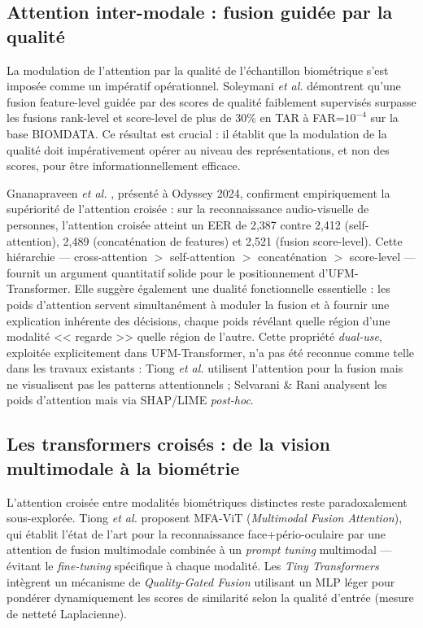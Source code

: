 \documentclass[12pt,a4paper]{report}
\begin{document}
\subsection{Attention inter-modale : fusion guid\'{e}e par la qualit\'{e}}

La modulation de l'attention par la qualit\'{e} de l'\'{e}chantillon biom\'{e}trique s'est impos\'{e}e comme un imp\'{e}ratif op\'{e}rationnel. Soleymani \textit{et al.} \cite{soleymani2021quality} d\'{e}montrent qu'une fusion feature-level guid\'{e}e par des scores de qualit\'{e} faiblement supervis\'{e}s surpasse les fusions rank-level et score-level de plus de 30\% en TAR \`{a} FAR=$10^{-4}$ sur la base BIOMDATA. Ce r\'{e}sultat est crucial : il \'{e}tablit que la modulation de la qualit\'{e} doit imp\'{e}rativement op\'{e}rer au niveau des repr\'{e}sentations, et non des scores, pour \^{e}tre informationnellement efficace.

Gnanapraveen \textit{et al.} \cite{gnanapraveen2024cross}, pr\'{e}sent\'{e} \`{a} Odyssey 2024, confirment empiriquement la sup\'{e}riorit\'{e} de l'attention crois\'{e}e : sur la reconnaissance audio-visuelle de personnes, l'attention crois\'{e}e atteint un EER de 2,387 contre 2,412 (self-attention), 2,489 (concat\'{e}nation de features) et 2,521 (fusion score-level). Cette hi\'{e}rarchie --- cross-attention $>$ self-attention $>$ concat\'{e}nation $>$ score-level --- fournit un argument quantitatif solide pour le positionnement d'UFM-Transformer. Elle sugg\`{e}re \'{e}galement une dualit\'{e} fonctionnelle essentielle : les poids d'attention servent simultan\'{e}ment \`{a} moduler la fusion et \`{a} fournir une explication inh\'{e}rente des d\'{e}cisions, chaque poids r\'{e}v\'{e}lant quelle r\'{e}gion d'une modalit\'{e} << regarde >> quelle r\'{e}gion de l'autre. Cette propri\'{e}t\'{e} \textit{dual-use}, exploit\'{e}e explicitement dans UFM-Transformer, n'a pas \'{e}t\'{e} reconnue comme telle dans les travaux existants : Tiong \textit{et al.} \cite{tiong2024flexible} utilisent l'attention pour la fusion mais ne visualisent pas les patterns attentionnels ; Selvarani \& Rani \cite{selvarani2025explainability} analysent les poids d'attention mais via SHAP/LIME \textit{post-hoc}.

\subsection{Les transformers crois\'{e}s : de la vision multimodale \`{a} la biom\'{e}trie}

L'attention crois\'{e}e entre modalit\'{e}s biom\'{e}triques distinctes reste paradoxalement sous-explor\'{e}e. Tiong \textit{et al.} \cite{tiong2024flexible} proposent MFA-ViT (\textit{Multimodal Fusion Attention}), qui \'{e}tablit l'\'{e}tat de l'art pour la reconnaissance face+p\'{e}rio-oculaire par une attention de fusion multimodale combin\'{e}e \`{a} un \textit{prompt tuning} multimodal --- \'{e}vitant le \textit{fine-tuning} sp\'{e}cifique \`{a} chaque modalit\'{e}. Les \textit{Tiny Transformers} \cite{tiny2026transformers} int\`{e}grent un m\'{e}canisme de \textit{Quality-Gated Fusion} utilisant un MLP l\'{e}ger pour pond\'{e}rer dynamiquement les scores de similarit\'{e} selon la qualit\'{e} d'entr\'{e}e (mesure de nettet\'{e} Laplacienne).
\end{document}

